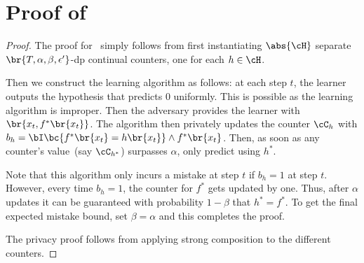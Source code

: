 \section{Proof of~}
\begin{proof} The proof for~ simply follows from first instantiating \(\abs{\cH}\) separate \(\br{T,\alpha,\beta,\epsilon'}\)-\Gls{dp} continual counters, one for each \(h\in\cH\). 

Then we construct the learning algorithm as follows: at each step \(t\), the learner outputs the hypothesis that predicts \(0\) uniformly. 
This is possible as the learning algorithm is improper. 
Then the adversary provides the learner with \(\br{x_t, f^*\br{x_t}}\). 
The algorithm then privately updates the counter \(\cC_{h}\) with \(b_h = \bI\bc{f^*\br{x_t} = h\br{x_t}}\wedge f^*\br{x_t}\). Then, as soon as any counter's value~(say \(\cC_{h^*}\)) surpasses \(\alpha\), only predict using \(h^*\).

Note that this algorithm only incurs a mistake at step \(t\) if \(b_h=1\) at step \(t\). 
However, every time \(b_h=1\), the counter for \(f^*\) gets updated by one. 
Thus, after \(\alpha\) updates it can be guaranteed with probability \(1-\beta\) that \(h^* = f^*\). 
To get the final expected mistake bound, set \(\beta = \alpha\) and this completes the proof.

The privacy proof follows from applying strong composition to the different counters.
\end{proof}